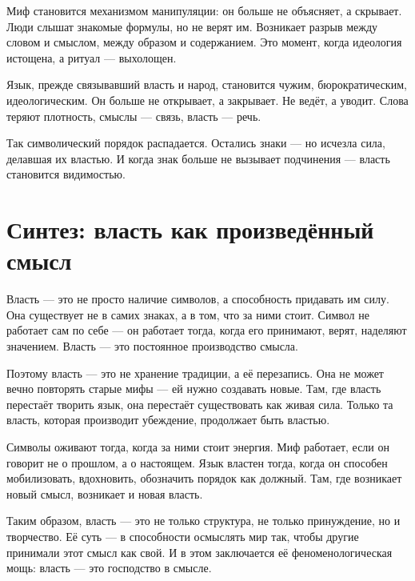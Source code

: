 Миф становится механизмом манипуляции: он больше не объясняет, а скрывает. Люди слышат знакомые формулы, но не верят им. Возникает разрыв между словом и смыслом, между образом и содержанием. Это момент, когда идеология истощена, а ритуал — выхолощен.

Язык, прежде связывавший власть и народ, становится чужим, бюрократическим, идеологическим. Он больше не открывает, а закрывает. Не ведёт, а уводит. Слова теряют плотность, смыслы — связь, власть — речь.

Так символический порядок распадается. Остались знаки — но исчезла сила, делавшая их властью. И когда знак больше не вызывает подчинения — власть становится видимостью.

\section{Синтез: власть как произведённый смысл}

Власть — это не просто наличие символов, а способность придавать им силу. Она существует не в самих знаках, а в том, что за ними стоит. Символ не работает сам по себе — он работает тогда, когда его принимают, верят, наделяют значением. Власть — это постоянное производство смысла.

Поэтому власть — это не хранение традиции, а её перезапись. Она не может вечно повторять старые мифы — ей нужно создавать новые. Там, где власть перестаёт творить язык, она перестаёт существовать как живая сила. Только та власть, которая производит убеждение, продолжает быть властью.

Символы оживают тогда, когда за ними стоит энергия. Миф работает, если он говорит не о прошлом, а о настоящем. Язык властен тогда, когда он способен мобилизовать, вдохновить, обозначить порядок как должный. Там, где возникает новый смысл, возникает и новая власть.

Таким образом, власть — это не только структура, не только принуждение, но и творчество. Её суть — в способности осмыслять мир так, чтобы другие принимали этот смысл как свой. И в этом заключается её феноменологическая мощь: власть — это господство в смысле.
